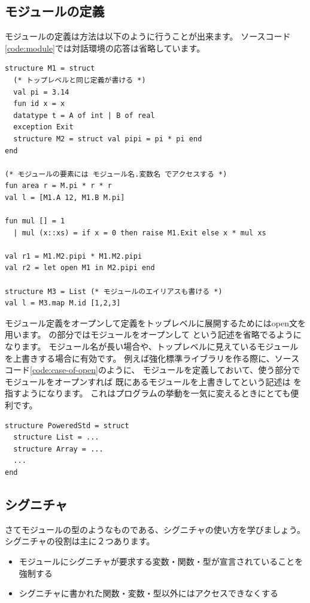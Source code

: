 \documentclass[11pt,a4paper]{jarticle}
\begin{document}
\subsection{モジュールの定義}

モジュールの定義は方法は以下のように行うことが出来ます。
ソースコード\ref{code:module}では対話環境の応答は省略しています。

\begin{lstlisting}[caption=モジュールの定義,label=code:module]
structure M1 = struct
  (* トップレベルと同じ定義が書ける *)
  val pi = 3.14
  fun id x = x
  datatype t = A of int | B of real
  exception Exit
  structure M2 = struct val pipi = pi * pi end
end

(* モジュールの要素には モジュール名.変数名 でアクセスする *)
fun area r = M.pi * r * r
val l = [M1.A 12, M1.B M.pi]

fun mul [] = 1
  | mul (x::xs) = if x = 0 then raise M1.Exit else x * mul xs

val r1 = M1.M2.pipi * M1.M2.pipi
val r2 = let open M1 in M2.pipi end

structure M3 = List (* モジュールのエイリアスも書ける *)
val l = M3.map M.id [1,2,3]
\end{lstlisting}

モジュール定義をオープンして定義をトップレベルに展開するためにはopen文を用います。
の部分ではモジュールをオープンして
という記述を省略でるようになります。
モジュール名が長い場合や、トップレベルに見えているモジュールを上書きする場合に有効です。
例えば強化標準ライブラリを作る際に、ソースコード\ref{code:case-of-open}のように、
モジュールを定義しておいて、使う部分でモジュールをオープンすれば
既にあるモジュールを上書きしてという記述は
を指すようになります。
これはプログラムの挙動を一気に変えるときにとても便利です。

\begin{lstlisting}[caption=openの使いドコロ,label=code:case-of-open]
structure PoweredStd = struct
  structure List = ...
  structure Array = ...
  ...
end
\end{lstlisting}

\subsection{シグニチャ}

さてモジュールの型のようなものである、シグニチャの使い方を学びましょう。
シグニチャの役割は主に２つあります。
\begin{itemize}
\item モジュールにシグニチャが要求する変数・関数・型が宣言されていることを強制する
\item シグニチャに書かれた関数・変数・型以外にはアクセスできなくする
\end{itemize}
\end{document}
